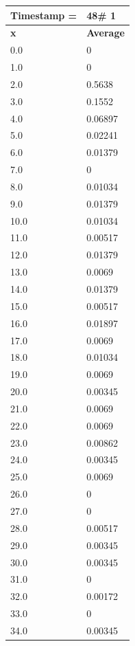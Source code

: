 \begin{tabular}{|l||l|}
\hline
\textbf{Timestamp =} & \textbf{48}\# 1\\\hline
	\textbf{x} & \textbf{Average} \\ \hline
\hline
	0.0 & 0 \\ \hline
	1.0 & 0 \\ \hline
	2.0 & 0.5638 \\ \hline
	3.0 & 0.1552 \\ \hline
	4.0 & 0.06897 \\ \hline
	5.0 & 0.02241 \\ \hline
	6.0 & 0.01379 \\ \hline
	7.0 & 0 \\ \hline
	8.0 & 0.01034 \\ \hline
	9.0 & 0.01379 \\ \hline
	10.0 & 0.01034 \\ \hline
	11.0 & 0.00517 \\ \hline
	12.0 & 0.01379 \\ \hline
	13.0 & 0.0069 \\ \hline
	14.0 & 0.01379 \\ \hline
	15.0 & 0.00517 \\ \hline
	16.0 & 0.01897 \\ \hline
	17.0 & 0.0069 \\ \hline
	18.0 & 0.01034 \\ \hline
	19.0 & 0.0069 \\ \hline
	20.0 & 0.00345 \\ \hline
	21.0 & 0.0069 \\ \hline
	22.0 & 0.0069 \\ \hline
	23.0 & 0.00862 \\ \hline
	24.0 & 0.00345 \\ \hline
	25.0 & 0.0069 \\ \hline
	26.0 & 0 \\ \hline
	27.0 & 0 \\ \hline
	28.0 & 0.00517 \\ \hline
	29.0 & 0.00345 \\ \hline
	30.0 & 0.00345 \\ \hline
	31.0 & 0 \\ \hline
	32.0 & 0.00172 \\ \hline
	33.0 & 0 \\ \hline
	34.0 & 0.00345 \\ \hline
\end{tabular}
